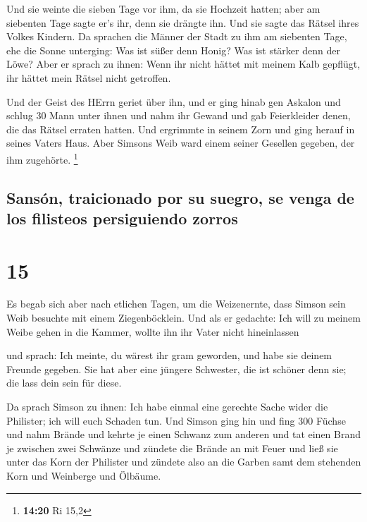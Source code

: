  Und sie weinte die sieben Tage vor ihm, da sie Hochzeit
hatten; aber am siebenten Tage sagte er's ihr, denn sie drängte ihn. Und
sie sagte das Rätsel ihres Volkes Kindern.  Da sprachen
die Männer der Stadt zu ihm am siebenten Tage, ehe die Sonne unterging:
Was ist süßer denn Honig? Was ist stärker denn der Löwe? Aber er sprach
zu ihnen: Wenn ihr nicht hättet mit meinem Kalb gepflügt, ihr hättet
mein Rätsel nicht getroffen.

 Und der Geist des HErrn geriet über ihn, und er ging
hinab gen Askalon und schlug 30 Mann unter ihnen und nahm ihr Gewand und
gab Feierkleider denen, die das Rätsel erraten hatten. Und ergrimmte in
seinem Zorn und ging herauf in seines Vaters Haus.  Aber
Simsons Weib ward einem seiner Gesellen gegeben, der ihm zugehörte.
\footnote{\textbf{14:20} Ri 15,2}

\hypertarget{sansuxf3n-traicionado-por-su-suegro-se-venga-de-los-filisteos-persiguiendo-zorros}{%
\subsection{Sansón, traicionado por su suegro, se venga de los filisteos
persiguiendo
zorros}\label{sansuxf3n-traicionado-por-su-suegro-se-venga-de-los-filisteos-persiguiendo-zorros}}

\hypertarget{section-14}{%
\section{15}\label{section-14}}

 Es begab sich aber nach etlichen Tagen, um die
Weizenernte, dass Simson sein Weib besuchte mit einem Ziegenböcklein.
Und als er gedachte: Ich will zu meinem Weibe gehen in die Kammer,
wollte ihn ihr Vater nicht hineinlassen

 und sprach: Ich meinte, du wärest ihr gram geworden, und
habe sie deinem Freunde gegeben. Sie hat aber eine jüngere Schwester,
die ist schöner denn sie; die lass dein sein für diese.

 Da sprach Simson zu ihnen: Ich habe einmal eine gerechte
Sache wider die Philister; ich will euch Schaden tun.  Und
Simson ging hin und fing 300 Füchse und nahm Brände und kehrte je einen
Schwanz zum anderen und tat einen Brand je zwischen zwei Schwänze
 und zündete die Brände an mit Feuer und ließ sie unter
das Korn der Philister und zündete also an die Garben samt dem stehenden
Korn und Weinberge und Ölbäume.

